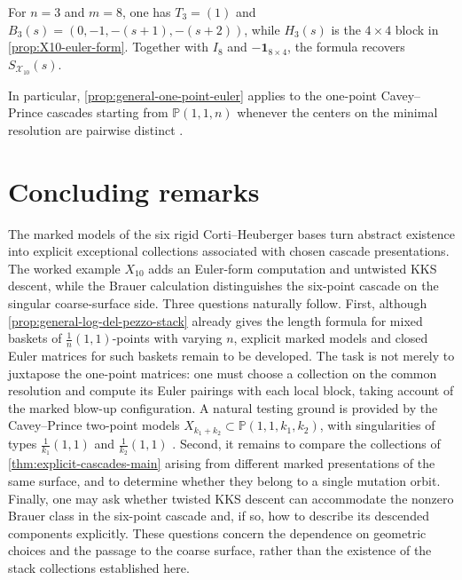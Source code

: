 \documentclass[11pt]{article}
\theoremstyle{plain}
\theoremstyle{definition}
\theoremstyle{remark}
\newcommand{\Pp}{\mathbb P}
\begin{document}
For \(n=3\) and \(m=8\), one has \(T_3=(1)\) and
\(B_3(s)=(0,-1,-(s+1),-(s+2))\), while \(H_3(s)\) is the
\(4\times4\) block in \cref{prop:X10-euler-form}. Together with \(I_8\) and
\(-\mathbf1_{8\times4}\), the formula recovers
\(S_{\mathcal X_{10}}(s)\).

In particular, \cref{prop:general-one-point-euler} applies to the one-point
Cavey--Prince cascades starting from \(\Pp(1,1,n)\) whenever the centers on
the minimal resolution are pairwise distinct \cite{CAVEY2020}.


\section*{Concluding remarks}

The marked models of the six rigid Corti--Heuberger bases turn abstract
existence into explicit exceptional collections associated with chosen
cascade presentations. The worked example \(X_{10}\) adds an Euler-form
computation and untwisted KKS descent, while the Brauer calculation
distinguishes the six-point cascade on the singular coarse-surface side.
Three questions naturally follow. First, although
\cref{prop:general-log-del-pezzo-stack} already gives the length formula
for mixed baskets of \(\frac1n(1,1)\)-points with varying \(n\),
explicit marked models and closed Euler matrices for such baskets remain
to be developed. The task is not merely to juxtapose the one-point
matrices: one must choose a collection on the common resolution and
compute its Euler pairings with each local block, taking account of the
marked blow-up configuration. A natural testing ground is provided by
the Cavey--Prince two-point models
\(X_{k_1+k_2}\subset\Pp(1,1,k_1,k_2)\), with singularities of types
\(\frac1{k_1}(1,1)\) and \(\frac1{k_2}(1,1)\)
\cite[Corollary~7.1]{CAVEY2020}. Second, it remains to compare
the collections of \cref{thm:explicit-cascades-main} arising from
different marked presentations of the same surface, and to determine
whether they belong to a single mutation orbit. Finally, one may ask
whether twisted KKS descent can accommodate the nonzero Brauer class
in the six-point cascade and, if so, how to describe its descended
components explicitly. These questions concern the dependence on
geometric choices and the passage to the coarse surface, rather than
the existence of the stack collections established here.

\end{document}
